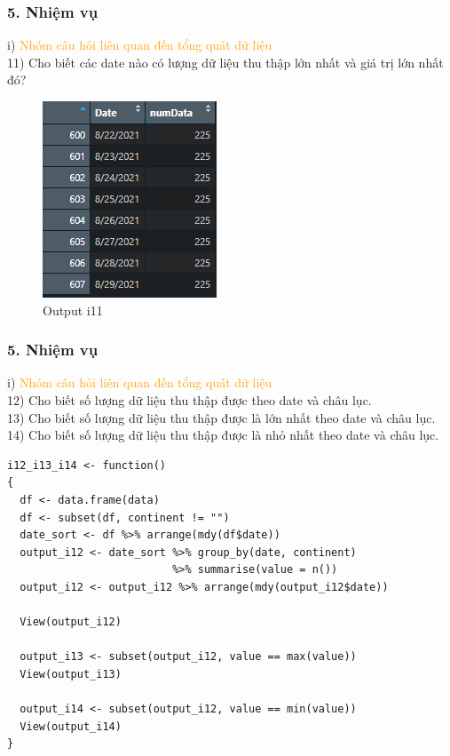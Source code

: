 \documentclass[english,10pt,table]{beamer}
\begin{document}
\begin{frame}[fragile]
\frametitle{5.  Nhiệm vụ}
	i) \textcolor{orange}{Nhóm câu hỏi liên quan đến tổng quát dữ liệu}\\
	11) Cho biết các date nào có lượng dữ liệu thu thập lớn nhất và giá trị lớn nhất đó?
\begin{figure}[h!]
	\begin{center}
		    \includegraphics[scale = 0.7]{Images/I/I11.png}
		            \caption{Output i11}
		\end{center}
		\end{figure}
\end{frame}

\begin{frame}[fragile]
\frametitle{5.  Nhiệm vụ}
	i) \textcolor{orange}{Nhóm câu hỏi liên quan đến tổng quát dữ liệu}\\
		12) Cho biết số lượng dữ liệu thu thập được theo date và châu lục.\\
		13) Cho biết số lượng dữ liệu thu thập được là lớn nhất theo date và châu lục.\\
		14) Cho biết số lượng dữ liệu thu thập được là nhỏ nhất theo date và châu lục.
   \begin{lstlisting}[frame=single,basicstyle=\tiny]  
i12_i13_i14 <- function()
{
  df <- data.frame(data)
  df <- subset(df, continent != "")
  date_sort <- df %>% arrange(mdy(df$date))
  output_i12 <- date_sort %>% group_by(date, continent) 
                          %>% summarise(value = n())
  output_i12 <- output_i12 %>% arrange(mdy(output_i12$date))

  View(output_i12)

  output_i13 <- subset(output_i12, value == max(value))
  View(output_i13)

  output_i14 <- subset(output_i12, value == min(value))
  View(output_i14)
}
	\end{lstlisting}
\end{frame}
\end{document}
